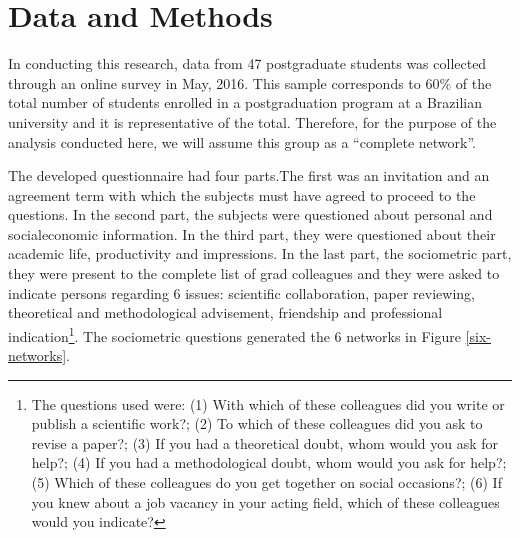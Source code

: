 \documentclass[a4paper, 12pt, openright, oneside, article, german, french, brazil, english]{abntex2}
\begin{document}
\section{Data and Methods}

In conducting this research, data from 47 postgraduate students was collected through an online survey in May, 2016. This sample corresponds to 60\% of the total number of students enrolled in a postgraduation program at a Brazilian university and it is representative of the total. Therefore, for the purpose of the analysis conducted here, we will assume this group as a ``complete network''.

The developed questionnaire had four parts.The first was an invitation and an agreement term with which the subjects must have agreed to proceed to the questions. In the second part, the subjects were questioned about personal and socialeconomic information. In the third part, they were questioned about their academic life, productivity and impressions. In the last part, the sociometric part, they were present to the complete list of grad colleagues and they were asked to indicate persons regarding 6 issues: scientific collaboration, paper reviewing, theoretical and methodological advisement, friendship and professional indication\footnote{The questions used were: (1) With which of these colleagues did you write or publish a scientific work?; (2) To which of these colleagues did you ask to revise a paper?; (3) If you had a theoretical doubt, whom would you ask for help?; (4) If you had a methodological doubt, whom would you ask for help?; (5) Which of these colleagues do you get together on social occasions?; (6) If you knew about a job vacancy in your acting field, which of these colleagues would you indicate?}. The sociometric questions generated the 6 networks in Figure \ref{six-networks}.
\end{document}
